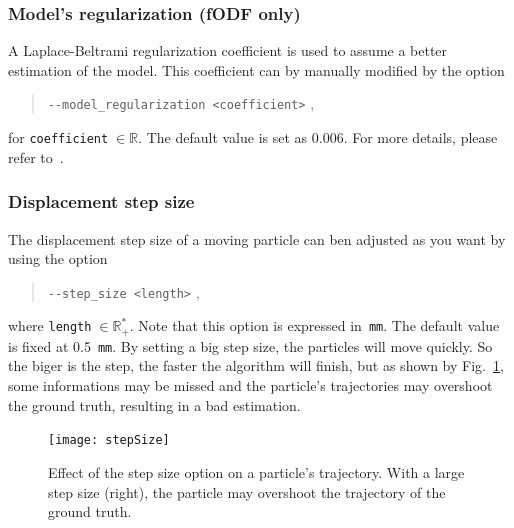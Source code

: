     \subsubsection*{Model's regularization (fODF only)}
        A Laplace-Beltrami regularization coefficient is used to assume a better
        estimation of the model. This coefficient can by manually modified by
the option
            \begin{quote}
                \texttt{-\hspace{0.1mm}-model\_regularization <coefficient>} \enspace ,
            \end{quote}
        for \texttt{coefficient}$\;\in\mathbb{R}$. The default value is set as 
        0.006. For more details, please refer
to~\cite{descoteaux_regularized_2007}.

    \subsubsection*{Displacement step size}
        The displacement step size of a moving particle can ben adjusted as you 
        want by using the option
            \begin{quote}
                \texttt{-\hspace{0.1mm}-step\_size <length>} \enspace ,
            \end{quote}
        where \texttt{length}$\;\in\mathbb{R}_+^*$. Note that this option is 
        expressed in~\texttt{mm}. The default value is fixed at 0.5~\texttt{mm}.
        By setting a big step size, the particles will move quickly. So the
biger is the step, the faster the algorithm will finish, but as shown by
Fig.~\ref{tracto-fig:stepSize}, some informations may be missed and the
particle's trajectories may overshoot the ground truth, resulting in a bad
estimation.

        \begin{figure}
            \centering
            \texttt{[image: stepSize]}
            \caption{Effect of the step size option on a particle's trajectory. 
            With a large step size (right), the particle may overshoot the
trajectory of the ground truth.}
            \label{tracto-fig:stepSize}
        \end{figure}


